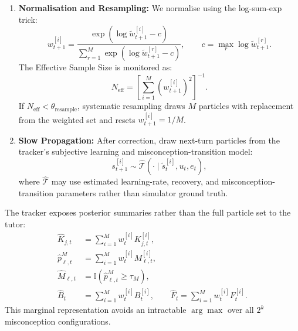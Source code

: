 \documentclass[11pt,a4paper]{report}
\begin{document}
\begin{enumerate}
    \item \textbf{Normalisation and Resampling:} We normalise using the log-sum-exp trick:
    \begin{equation}
        w_{t+1}^{[i]} =
        \frac{\exp(\log \tilde{w}_{t+1}^{[i]} - c)}
        {\sum_{r=1}^{M}\exp(\log \tilde{w}_{t+1}^{[r]} - c)},
        \qquad
        c=\max_r \log \tilde{w}_{t+1}^{[r]}.
    \end{equation}
    The Effective Sample Size is monitored as:
    \begin{equation}
        N_{\text{eff}} =
        \left[\sum_{i=1}^{M}(w_{t+1}^{[i]})^2\right]^{-1}.
    \end{equation}
    If $N_{\text{eff}}<\theta_{\text{resample}}$, systematic resampling draws $M$ particles with replacement from the weighted set and resets $w_{t+1}^{[i]}=1/M$.

    \item \textbf{Slow Propagation:} After correction, draw next-turn particles from the tracker's subjective learning and misconception-transition model:
    \begin{equation}
        s_{t+1}^{[i]} \sim \hat{\mathcal{T}}(\cdot \mid \tilde{s}_t^{[i]},u_t,e_t),
    \end{equation}
    where $\hat{\mathcal{T}}$ may use estimated learning-rate, recovery, and misconception-transition parameters rather than simulator ground truth.
\end{enumerate}

The tracker exposes posterior summaries rather than the full particle set to the tutor:
\begin{align}
    \hat{K}_{j,t} &= \sum_{i=1}^M w_t^{[i]}K_{j,t}^{[i]}, \\
    \hat{p}^{M}_{\ell,t} &= \sum_{i=1}^M w_t^{[i]}M_{\ell,t}^{[i]}, \\
    \hat{M}_{\ell,t} &= \mathbb{I}(\hat{p}^{M}_{\ell,t}\ge\tau_M), \\
    \hat{B}_t &= \sum_{i=1}^M w_t^{[i]}B_t^{[i]}, \qquad
    \hat{F}_t = \sum_{i=1}^M w_t^{[i]}F_t^{[i]}.
\end{align}
This marginal representation avoids an intractable $\arg\max$ over all $2^k$ misconception configurations.
\end{document}
